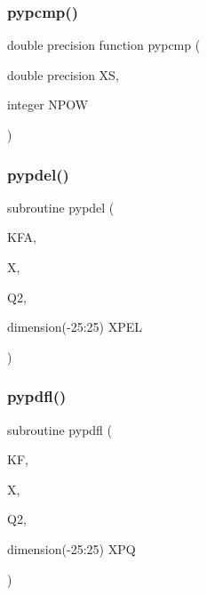 \mbox{\label{pythia-6_84_824_8f_a798f90cb9dfdd7ac82ec4df67aa3c137}} 
\subsubsection{\texorpdfstring{pypcmp()}{pypcmp()}}
{\footnotesize\ttfamily double precision function pypcmp (\begin{DoxyParamCaption}\item[{double precision}]{XS,  }\item[{integer}]{N\+P\+OW }\end{DoxyParamCaption})}

\mbox{\label{pythia-6_84_824_8f_a685bfaaf4e371dea879c7215f06ef963}} 
\subsubsection{\texorpdfstring{pypdel()}{pypdel()}}
{\footnotesize\ttfamily subroutine pypdel (\begin{DoxyParamCaption}\item[{}]{K\+FA,  }\item[{}]{X,  }\item[{}]{Q2,  }\item[{dimension(-\/25\+:25)}]{X\+P\+EL }\end{DoxyParamCaption})}

\mbox{\label{pythia-6_84_824_8f_aeceae4435f53744a1fd6d16580b88e9b}} 
\subsubsection{\texorpdfstring{pypdfl()}{pypdfl()}}
{\footnotesize\ttfamily subroutine pypdfl (\begin{DoxyParamCaption}\item[{}]{KF,  }\item[{}]{X,  }\item[{}]{Q2,  }\item[{dimension(-\/25\+:25)}]{X\+PQ }\end{DoxyParamCaption})}


